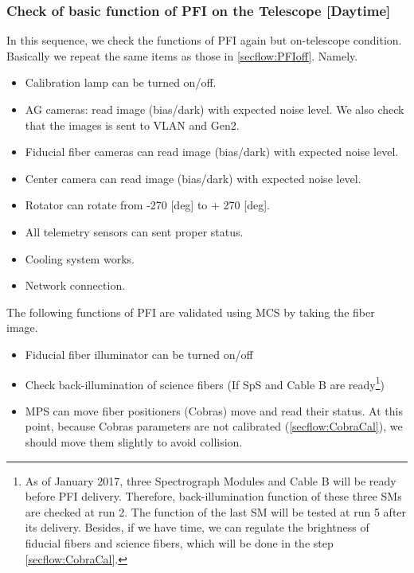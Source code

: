 \subsubsection{Check of basic function of PFI on the Telescope [Daytime]}\label{secflow:PFIon}


In this sequence, we check the functions of PFI again but on-telescope condition.
Basically we repeat the same items as those in \ref{secflow:PFIoff}.
Namely.
\begin{itemize}
\item Calibration lamp can be turned on/off.
\item AG cameras: read image (bias/dark) with expected noise level.
We also check that the images is sent to VLAN and Gen2.
\item Fiducial fiber cameras can read image (bias/dark) with expected noise level.
\item Center camera can read image (bias/dark) with expected noise level.
\item Rotator can rotate from -270 [deg] to + 270 [deg].
\item All telemetry sensors can sent proper status.
\item Cooling system works.
\item Network connection.
\end{itemize}

The following functions of PFI are validated using MCS by taking the fiber image.
\begin{itemize}
\item Fiducial fiber illuminator can be  turned on/off 
\item Check back-illumination of science fibers (If SpS and Cable B are ready\footnote{As of January 2017, three Spectrograph Modules and Cable B will be ready before PFI delivery. Therefore, back-illumination function of these three SMs are checked at run 2. The function of the last SM will be tested at run 5 after its delivery. Besides, if we have time, we can regulate the brightness of fiducial fibers and science fibers, which will be done in the step \ref{secflow:CobraCal}.})
\item MPS can move fiber positioners (Cobras) move and read their status.
At this point, because Cobras parameters are not calibrated (\ref{secflow:CobraCal}), we should move them slightly to avoid collision.
\end{itemize}

